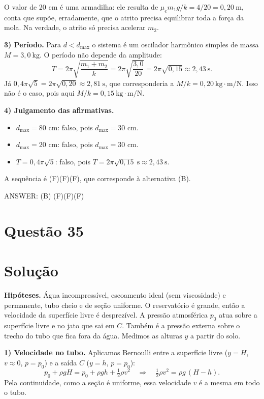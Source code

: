 \documentclass{article}%
\begin{document}
O valor de 20 cm é uma armadilha: ele resulta de $\mu_e m_1 g/k=4/20=0{,}20\ \text{m}$, conta que supõe, erradamente, que o atrito precisa equilibrar toda a força da mola. Na verdade, o atrito só precisa acelerar $m_2$.

\textbf{3) Período.} Para $d<d_{\max}$ o sistema é um oscilador harmônico simples de massa $M=3{,}0\ \text{kg}$. O período não depende da amplitude:
\[
T=2\pi\sqrt{\frac{m_1+m_2}{k}}=2\pi\sqrt{\frac{3{,}0}{20}}=2\pi\sqrt{0{,}15}\approx 2{,}43\ \text{s}.
\]
Já $0{,}4\pi\sqrt5=2\pi\sqrt{0{,}20}\approx 2{,}81\ \text{s}$, que corresponderia a $M/k=0{,}20\ \text{kg}\cdot\text{m/N}$. Isso não é o caso, pois aqui $M/k=0{,}15\ \text{kg}\cdot\text{m/N}$.

\textbf{4) Julgamento das afirmativas.}
\begin{itemize}
\item[(F)] $d_{\max}=80$ cm: falso, pois $d_{\max}=30$ cm.
\item[(F)] $d_{\max}=20$ cm: falso, pois $d_{\max}=30$ cm.
\item[(F)] $T=0{,}4\pi\sqrt5$: falso, pois $T=2\pi\sqrt{0{,}15}\ \text{s}\approx 2{,}43\ \text{s}$.
\end{itemize}
A sequência é (F)(F)(F), que corresponde à alternativa (B).

ANSWER: (B) (F)(F)(F)%
\newpage%
\section*{Questão 35}

\section*{Solução}

\textbf{Hipóteses.} Água incompressível, escoamento ideal (sem viscosidade) e permanente, tubo cheio e de seção uniforme. O reservatório é grande, então a velocidade da superfície livre é desprezível. A pressão atmosférica $p_0$ atua sobre a superfície livre e no jato que sai em $C$. Também é a pressão externa sobre o trecho do tubo que fica fora da água. Medimos as alturas $y$ a partir do solo.

\textbf{1) Velocidade no tubo.} Aplicamos Bernoulli entre a superfície livre ($y=H$, $v\approx 0$, $p=p_0$) e a saída $C$ ($y=h$, $p=p_0$):
\[
p_0+\rho g H = p_0+\rho g h+\tfrac12\rho v^2
\quad\Longrightarrow\quad
\tfrac12\rho v^2=\rho g\,(H-h).
\]
Pela continuidade, como a seção é uniforme, essa velocidade $v$ é a mesma em todo o tubo.
\end{document}
